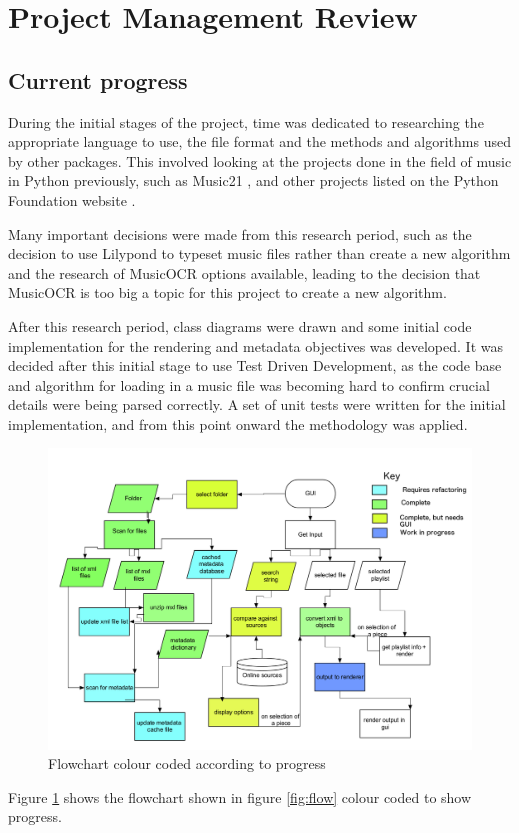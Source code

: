 \section{Project Management Review}
\subsection{Current progress}

During the initial stages of the project, time was dedicated to researching the appropriate language to use, the file format and the methods and algorithms used by other packages. This involved looking at the projects done in the field of music in Python previously, such as Music21 \parencite{Music21}, and other projects listed on the Python Foundation website \parencite{pmus}. 

Many important decisions were made from this research period, such as the decision to use Lilypond to typeset music files rather than create a new algorithm and the research of MusicOCR options available, leading to the decision that MusicOCR is too big a topic for this project to create a new algorithm.


After this research period, class diagrams were drawn and some initial code implementation for the rendering and metadata objectives was developed. It was decided after this initial stage to use Test Driven Development, as the code base and algorithm for loading in a music file was becoming hard to confirm crucial details were being parsed correctly. A set of unit tests were written for the initial implementation, and from this point onward the methodology was applied.

\begin{figure}[h]
    \centering
    \includegraphics[width=420pt]{flowchart-progress.png}
    \caption{Flowchart colour coded according to progress}
    \label{fig:colours}
\end{figure}
Figure \ref{fig:colours} shows the flowchart shown in figure \ref{fig:flow} colour coded to show progress. 

